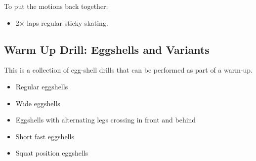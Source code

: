 To put the motions back together:
\begin{itemize}
    \item 2$\times$ laps regular sticky skating. 
\end{itemize}


\subsection*{Warm Up Drill: Eggshells and Variants}

This is a collection of egg-shell drills that can be performed as part of a warm-up. 

\begin{itemize}
    \item Regular eggshells  
    \item Wide eggshells
    \item Eggshells with alternating legs crossing in front and behind 
    \item Short fast eggshells 
    \item Squat position eggshells
\end{itemize}
